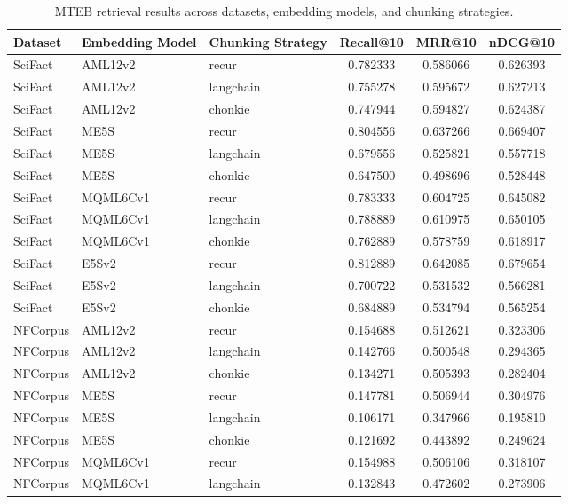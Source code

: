 \begin{table}[t]
\centering
\caption{MTEB retrieval results across datasets, embedding models, and chunking strategies.}
\label{tab:mteb_results}
\begin{adjustbox}{width=\textwidth}
\begin{tabular}{ll l c c c}
\toprule
Dataset & Embedding Model & Chunking Strategy & Recall@10 & MRR@10 & nDCG@10 \\
\midrule
SciFact & AML12v2   & recur     & 0.782333 & 0.586066 & 0.626393 \\
SciFact & AML12v2   & langchain & 0.755278 & 0.595672 & 0.627213 \\
SciFact & AML12v2   & chonkie   & 0.747944 & 0.594827 & 0.624387 \\
SciFact & ME5S      & recur     & 0.804556 & 0.637266 & 0.669407 \\
SciFact & ME5S      & langchain & 0.679556 & 0.525821 & 0.557718 \\
SciFact & ME5S      & chonkie   & 0.647500 & 0.498696 & 0.528448 \\
SciFact & MQML6Cv1  & recur     & 0.783333 & 0.604725 & 0.645082 \\
SciFact & MQML6Cv1  & langchain & 0.788889 & 0.610975 & 0.650105 \\
SciFact & MQML6Cv1  & chonkie   & 0.762889 & 0.578759 & 0.618917 \\
SciFact & E5Sv2     & recur     & 0.812889 & 0.642085 & 0.679654 \\
SciFact & E5Sv2     & langchain & 0.700722 & 0.531532 & 0.566281 \\
SciFact & E5Sv2     & chonkie   & 0.684889 & 0.534794 & 0.565254 \\
\midrule
NFCorpus & AML12v2  & recur     & 0.154688 & 0.512621 & 0.323306 \\
NFCorpus & AML12v2  & langchain & 0.142766 & 0.500548 & 0.294365 \\
NFCorpus & AML12v2  & chonkie   & 0.134271 & 0.505393 & 0.282404 \\
NFCorpus & ME5S     & recur     & 0.147781 & 0.506944 & 0.304976 \\
NFCorpus & ME5S     & langchain & 0.106171 & 0.347966 & 0.195810 \\
NFCorpus & ME5S     & chonkie   & 0.121692 & 0.443892 & 0.249624 \\
NFCorpus & MQML6Cv1 & recur     & 0.154988 & 0.506106 & 0.318107 \\
NFCorpus & MQML6Cv1 & langchain & 0.132843 & 0.472602 & 0.273906 \\

\end{tabular}
\end{adjustbox}
\end{table}
